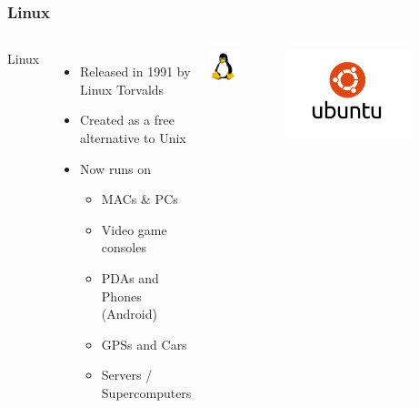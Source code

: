 \documentclass{beamer}
\begin{document}
\begin{frame}
  \frametitle{Linux}
  \begin{columns}
    \begin{LARGE}
      Linux
    \end{LARGE}
    \begin{itemize}
    \item Released in 1991 by Linux Torvalds
    \item Created as a free alternative to Unix
    \item Now runs on
      \begin{itemize}
      \item MACs \& PCs
      \item Video game consoles
      \item PDAs and Phones (Android)
      \item GPSs and Cars
      \item Servers / Supercomputers
      \end{itemize}
    \end{itemize}
      \begin{center}\includegraphics[width=0.5\textwidth]{../img/tux}\end{center}
      
      \begin{center}\includegraphics[width=0.7\textwidth]{../img/ubuntu-stacked}\end{center}
  \end{columns}
\end{frame}
\end{document}
